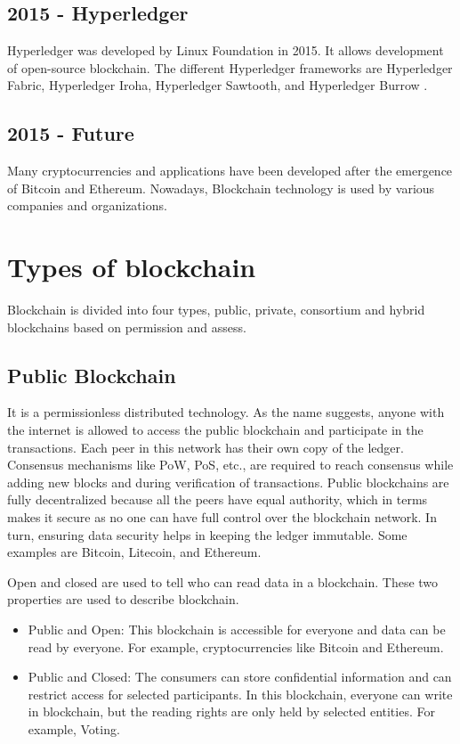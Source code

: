  \subsection{2015 - Hyperledger}
Hyperledger was developed by Linux Foundation in 2015. It allows development of open-source blockchain. The different Hyperledger frameworks are Hyperledger Fabric, Hyperledger Iroha, Hyperledger Sawtooth, and Hyperledger Burrow \cite{hyperledgertypes}.

\subsection {2015 - Future}
Many cryptocurrencies and applications have been developed after the emergence of Bitcoin and Ethereum. Nowadays, Blockchain technology is used by various companies and organizations.

\section{Types of blockchain}

Blockchain is divided into four types, public, private, consortium and hybrid blockchains based on permission and assess.
\subsection{Public Blockchain}
It is a permissionless distributed technology. As the name suggests, anyone with the internet is allowed to access the public blockchain and participate in the transactions. Each peer in this network has their own copy of the ledger. Consensus mechanisms like \ac{PoW}, \ac{PoS}, etc., are required to reach consensus while adding new blocks and during verification of transactions. Public blockchains are fully decentralized because all the peers have equal authority, which in terms makes it secure as no one can have full control over the blockchain network. In turn,  ensuring data security helps in keeping the ledger immutable. Some examples are Bitcoin, Litecoin, and Ethereum.

Open and closed are used to tell who can read data in a blockchain. These two properties are used to describe blockchain.
\begin{itemize}
    \item Public and Open: This blockchain is accessible for everyone and data can be read by everyone. For example, cryptocurrencies like Bitcoin  and Ethereum.
    \item Public and Closed: The consumers can store confidential information and can restrict access for selected participants. In this blockchain, everyone can write in blockchain, but the reading rights are only held by selected entities. For example, Voting.
\end{itemize}


